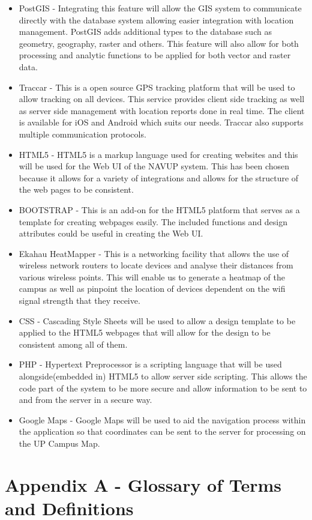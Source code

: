\documentclass{article}
\begin{document}
\begin{itemize}
\item PostGIS - Integrating this feature will allow the GIS system to communicate directly with the database system allowing easier integration with location management. PostGIS adds additional types to the database such as geometry, geography, raster and others. This feature will also allow for both processing and analytic functions to be applied for both vector and raster data.
\item Traccar - This is a open source GPS tracking platform that will be used to allow tracking on all devices. This service provides client side tracking as well as server side management with location reports done in real time. The client is available for iOS and Android which suits our needs. Traccar also supports multiple communication protocols. 
\item HTML5 - HTML5 is a markup language used for creating websites and this will be used for the Web UI of the NAVUP system. This has been chosen because it allows for a variety of integrations and allows for the structure of the web pages to be consistent. 
\item BOOTSTRAP - This is an add-on for the HTML5 platform that serves as a template for creating webpages easily. The included functions and design attributes could be useful in creating the Web UI.
\item Ekahau HeatMapper - This is a networking facility that allows the use of wireless network routers to locate devices and analyse their distances from various wireless points. This will enable us to generate a heatmap of the campus as well as pinpoint the location of devices dependent on the wifi signal strength that they receive.
\item CSS - Cascading Style Sheets will be used to allow a design template to be applied to the HTML5 webpages that will allow for the design to be consistent among all of them.
\item PHP - Hypertext Preprocessor is a scripting language that will be used alongside(embedded in) HTML5 to allow server side scripting. This allows the code part of the system to be more secure and allow information to be sent to and from the server in a secure way.
\item Google Maps - Google Maps will be used to aid the navigation process within the application so that coordinates can be sent to the server for processing on the UP Campus Map. 
\end{itemize}
\newpage
\section{Appendix A - Glossary of Terms and Definitions}
\end{document}
